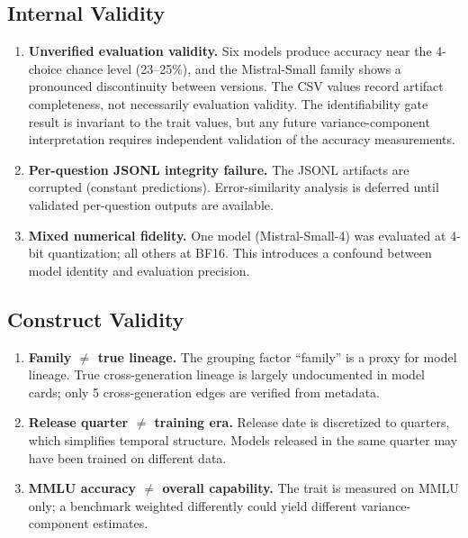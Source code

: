 \documentclass[11pt]{article}
\theoremstyle{definition}
\theoremstyle{plain}
\begin{document}
\subsection{Internal Validity}
\begin{enumerate}
\item \textbf{Unverified evaluation validity.} Six models produce accuracy near the 4-choice chance level (23--25\%), and the Mistral-Small family shows a pronounced discontinuity between versions. The CSV values record artifact completeness, not necessarily evaluation validity. The identifiability gate result is invariant to the trait values, but any future variance-component interpretation requires independent validation of the accuracy measurements.
\item \textbf{Per-question JSONL integrity failure.} The JSONL artifacts are corrupted (constant predictions). Error-similarity analysis is deferred until validated per-question outputs are available.
\item \textbf{Mixed numerical fidelity.} One model (Mistral-Small-4) was evaluated at 4-bit quantization; all others at BF16. This introduces a confound between model identity and evaluation precision.
\end{enumerate}

\subsection{Construct Validity}
\begin{enumerate}
\item \textbf{Family $\neq$ true lineage.} The grouping factor ``family'' is a proxy for model lineage. True cross-generation lineage is largely undocumented in model cards; only 5 cross-generation edges are verified from metadata.
\item \textbf{Release quarter $\neq$ training era.} Release date is discretized to quarters, which simplifies temporal structure. Models released in the same quarter may have been trained on different data.
\item \textbf{MMLU accuracy $\neq$ overall capability.} The trait is measured on MMLU only; a benchmark weighted differently could yield different variance-component estimates.
\end{enumerate}
\end{document}
